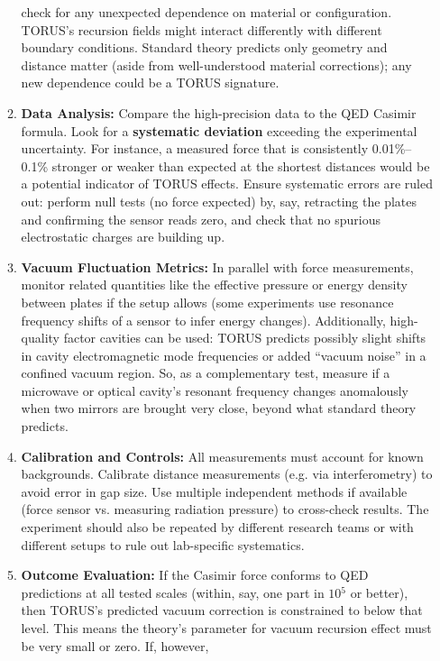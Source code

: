\documentclass[]{article}
\newcommand{\superscript}[1]{\ensuremath{^{\mathrm{#1}}}}
\begin{document}
\begin{itemize}
\begin{enumerate}
    check for any unexpected dependence on material or configuration.
    TORUS's recursion fields might interact differently with different
    boundary conditions​. Standard theory predicts only geometry and
    distance matter (aside from well-understood material corrections);
    any new dependence could be a TORUS signature.
  \item
    \textbf{Data Analysis:} Compare the high-precision data to the QED
    Casimir formula. Look for a \textbf{systematic deviation} exceeding
    the experimental uncertainty. For instance, a measured force that is
    consistently 0.01\%--0.1\% stronger or weaker than expected at the
    shortest distances would be a potential indicator of TORUS effects​.
    Ensure systematic errors are ruled out: perform null tests (no force
    expected) by, say, retracting the plates and confirming the sensor
    reads zero, and check that no spurious electrostatic charges are
    building up.
  \item
    \textbf{Vacuum Fluctuation Metrics:} In parallel with force
    measurements, monitor related quantities like the effective pressure
    or energy density between plates if the setup allows (some
    experiments use resonance frequency shifts of a sensor to infer
    energy changes). Additionally, high-quality factor cavities can be
    used: TORUS predicts possibly slight shifts in cavity
    electromagnetic mode frequencies or added ``vacuum noise'' in a
    confined vacuum region​. So, as a complementary test, measure if a
    microwave or optical cavity's resonant frequency changes anomalously
    when two mirrors are brought very close, beyond what standard theory
    predicts.
  \item
    \textbf{Calibration and Controls:} All measurements must account for
    known backgrounds. Calibrate distance measurements (e.g. via
    interferometry) to avoid error in gap size. Use multiple independent
    methods if available (force sensor vs. measuring radiation pressure)
    to cross-check results. The experiment should also be repeated by
    different research teams or with different setups to rule out
    lab-specific systematics.
  \item
    \textbf{Outcome Evaluation:} If the Casimir force conforms to QED
    predictions at all tested scales (within, say, one part in
    $10\superscript{5}$ or better), then TORUS's predicted vacuum correction is
    constrained to below that level​. This means the theory's parameter
    for vacuum recursion effect must be very small or zero. If, however,

\end{enumerate}
\end{itemize}
\end{document}
